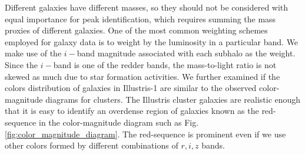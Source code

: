 Different galaxies have different masses, so they should not be considered with equal
importance for peak identification, which requires summing
the mass proxies of different galaxies. 
One of the most common weighting schemes employed for galaxy data is to weight
by the luminosity in a particular band. We make use of the $i-$band magnitude
associated with each subhalo as the weight. Since the $i-$band is
one of the redder bands, the mass-to-light ratio is not skewed as much due to star
formation activities. 
We further examined if the colors distribution of galaxies in Illustris-1 are
similar to the observed color-magnitude diagrams for clusters.
The Illustris cluster galaxies are realistic enough that it is easy to
identify an overdense region of galaxies known as the red-sequence in the 
color-magnitude diagram such as Fig.
\ref{fig:color_magnitude_diagram}. The red-sequence is prominent even if we
use other colors formed by different combinations of $r, i, z$ bands.

